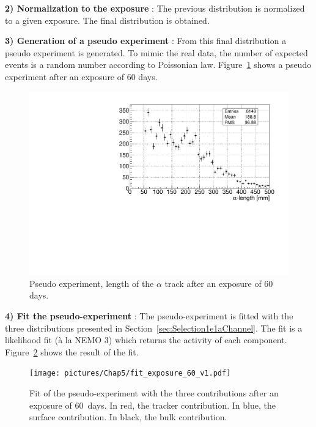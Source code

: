 \documentclass[main.tex]{subfiles}
\begin{document}
\bigskip


\noindent \textbf{2) Normalization to the exposure} : The previous distribution is normalized to a given exposure. The final distribution is obtained.


\bigskip


\noindent \textbf{3) Generation of a pseudo experiment} : From this final distribution a pseudo experiment is generated. To mimic the real data, the number of expected events is a random number according to Poissonian law. Figure~\ref{pseudo-experiment} shows a pseudo experiment after an exposure of 60 days.


\begin{figure}[h!]
\begin{center}
\includegraphics[scale=0.50]{pictures/Chap5/alph_length_exposure_60.pdf}
\caption{Pseudo experiment, length of the $\alpha$ track after an exposure of 60 days.}
\label{pseudo-experiment}
\end{center}
\end{figure}


\bigskip


\noindent \textbf{4) Fit the pseudo-experiment} : The pseudo-experiment is fitted with the three distributions presented in Section~\ref{sec:Selection1e1aChannel}. The fit is a likelihood fit (\`a la NEMO 3) which returns the activity of each component. Figure~\ref{fit-pseudo-experiment} shows the result of the fit.


\begin{figure}[h!]
\begin{center}
\texttt{[image: pictures/Chap5/fit\_exposure\_60\_v1.pdf]}
\caption{Fit of the pseudo-experiment with the three contributions after an exposure of 60~days. In red, the tracker contribution. In blue, the surface contribution. In black, the bulk contribution.}
\label{fit-pseudo-experiment}
\end{center}
\end{figure}
\end{document}
